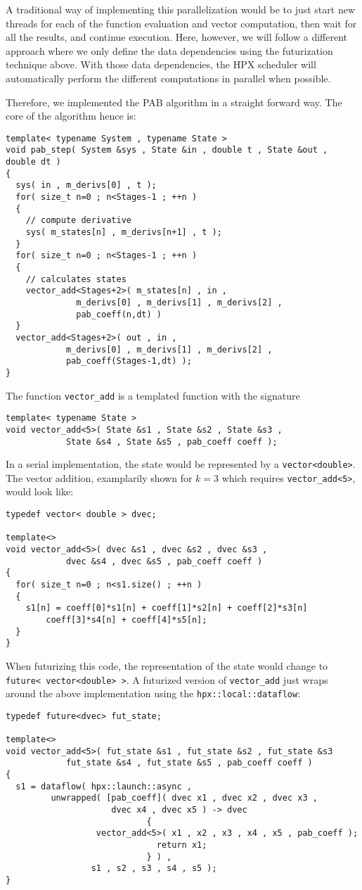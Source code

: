 \documentclass[10pt]{scrartcl}
\begin{document}
A traditional way of implementing this parallelization would be to just start new threads for each of the function evaluation and vector computation, then wait for all the results, and continue execution.
Here, however, we will follow a different approach where we only define the data dependencies using the futurization technique above.
With those data dependencies, the HPX scheduler will automatically perform the different computations in parallel when possible.

Therefore, we implemented the PAB algorithm in a straight forward way.
The core of the algorithm hence is:
\begin{lstlisting}
template< typename System , typename State >
void pab_step( System &sys , State &in , double t , State &out , double dt )
{
  sys( in , m_derivs[0] , t );
  for( size_t n=0 ; n<Stages-1 ; ++n )
  {
    // compute derivative
    sys( m_states[n] , m_derivs[n+1] , t );
  }
  for( size_t n=0 ; n<Stages-1 ; ++n )
  {
    // calculates states
    vector_add<Stages+2>( m_states[n] , in , 
			  m_derivs[0] , m_derivs[1] , m_derivs[2] , 
			  pab_coeff(n,dt) )
  }
  vector_add<Stages+2>( out , in , 
			m_derivs[0] , m_derivs[1] , m_derivs[2] , 
			pab_coeff(Stages-1,dt) );
}
\end{lstlisting}
%
The function \lstinline+vector_add+ is a templated function with the signature
\begin{lstlisting}
template< typename State >
void vector_add<5>( State &s1 , State &s2 , State &s3 , 
		    State &s4 , State &s5 , pab_coeff coeff );
\end{lstlisting}
%
In a serial implementation, the state would be represented by a \lstinline+vector<double>+.
The vector addition, examplarily shown for $k=3$ which requires \lstinline+vector_add<5>+, would look like:
\begin{lstlisting}
typedef vector< double > dvec;

template<>
void vector_add<5>( dvec &s1 , dvec &s2 , dvec &s3 , 
		    dvec &s4 , dvec &s5 , pab_coeff coeff )
{
  for( size_t n=0 ; n<s1.size() ; ++n )
  {
    s1[n] = coeff[0]*s1[n] + coeff[1]*s2[n] + coeff[2]*s3[n] 
	    coeff[3]*s4[n] + coeff[4]*s5[n];
  }
}
\end{lstlisting}
%
When futurizing this code, the representation of the state would change to \lstinline+future< vector<double> >+.
A futurized version of \lstinline+vector_add+ just wraps around the above implementation using the \lstinline+hpx::local::dataflow+:
\begin{lstlisting}
typedef future<dvec> fut_state;

template<>
void vector_add<5>( fut_state &s1 , fut_state &s2 , fut_state &s3 
		    fut_state &s4 , fut_state &s5 , pab_coeff coeff )
{
  s1 = dataflow( hpx::launch::async , 
		 unwrapped( [pab_coeff]( dvec x1 , dvec x2 , dvec x3 ,
					 dvec x4 , dvec x5 ) -> dvec  
                            {
			      vector_add<5>( x1 , x2 , x3 , x4 , x5 , pab_coeff );
                              return x1;
                            } ) ,
                 s1 , s2 , s3 , s4 , s5 );
}
\end{lstlisting}
\end{document}
